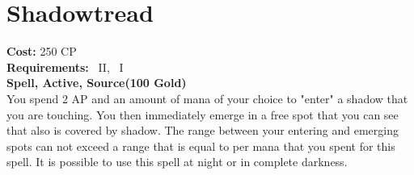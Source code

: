 \section{Shadowtread}\label{spell:shadowtread}
\textbf{Cost:} 250 CP\\
\textbf{Requirements:}~ II,~ I\\
\textbf{Spell, Active, Source(100 Gold)}\\
You spend 2 AP and an amount of mana of your choice to "enter" a shadow that you are touching.
You then immediately emerge in a free spot that you can see that also is covered by shadow.
The range between your entering and emerging spots can not exceed a range that is equal to  per mana that you spent for this spell.
It is possible to use this spell at night or in complete darkness.\\